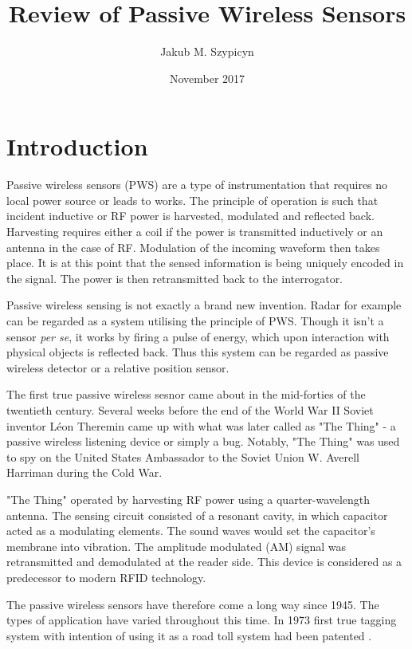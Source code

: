 \documentclass[11pt,a4paper]{article}
\begin{document}
\title{Review of Passive Wireless Sensors}
\author{Jakub M. Szypicyn}
\date{November 2017}
\maketitle
\tableofcontents
\pagebreak
\section{Introduction}

Passive wireless sensors (PWS) are a type of instrumentation that requires no local power source or leads to works. The principle of operation is such that incident inductive or RF power is harvested, modulated and reflected back. Harvesting requires either a coil if the power is transmitted inductively or an antenna in the case of RF. Modulation of the incoming waveform then takes place. It is at this point that the sensed information is being uniquely encoded in the signal. The power is then retransmitted back to the interrogator.

Passive wireless sensing is not exactly a brand new invention. Radar for example can be regarded as a system utilising the principle of PWS. Though it isn't a sensor \textit{per se}, it works by firing a pulse of energy, which upon interaction with physical objects is reflected back. Thus this system can be regarded as passive wireless detector or a relative position sensor.

The first true passive wireless sesnor came about in the mid-forties of the twentieth century. Several weeks before the end of the World War II Soviet inventor Léon Theremin came up with what was later called as "The Thing" - a passive wireless listening device or simply a bug. Notably, "The Thing" was used to spy on the United States Ambassador to the Soviet Union W. Averell Harriman during the Cold War. 

"The Thing" operated by harvesting RF power using a quarter-wavelength antenna. The sensing circuit consisted of a resonant cavity, in which capacitor acted as a modulating elements. The sound waves would set the capacitor's membrane into vibration. The amplitude modulated (AM) signal was retransmitted and demodulated at the reader side. This device is considered as a predecessor to modern RFID technology\cite{thing}.

The passive wireless sensors have therefore come a long way since 1945. The types of application have varied throughout this time. In 1973 first true tagging system with intention of using it as a road toll system had been patented \cite{toll}.
\end{document}
